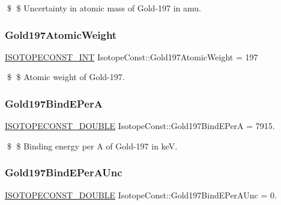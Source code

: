 \$ \$ Uncertainty in atomic mass of Gold-\/197 in amu. \mbox{\label{group___isotope_const-_gold-_au197_gad5a8898e7bb7d4cd224bde8a453be610}} 
\subsubsection{\texorpdfstring{Gold197\+Atomic\+Weight}{Gold197AtomicWeight}}
{\footnotesize\ttfamily \mbox{\hyperlink{group___isotope_const-_macros_ga5f18360b3e99483a35c32d789e62621c}{I\+S\+O\+T\+O\+P\+E\+C\+O\+N\+S\+T\+\_\+\+I\+NT}} Isotope\+Const\+::\+Gold197\+Atomic\+Weight = 197}

\$ \$ Atomic weight of Gold-\/197. \mbox{\label{group___isotope_const-_gold-_au197_ga88d86371a400ebcee68e4640bfe9cdb9}} 
\subsubsection{\texorpdfstring{Gold197\+Bind\+E\+PerA}{Gold197BindEPerA}}
{\footnotesize\ttfamily \mbox{\hyperlink{group___isotope_const-_macros_ga8f45a7272ce02c0b4c65c44636ed719a}{I\+S\+O\+T\+O\+P\+E\+C\+O\+N\+S\+T\+\_\+\+D\+O\+U\+B\+LE}} Isotope\+Const\+::\+Gold197\+Bind\+E\+PerA = 7915.}

\$ \$ Binding energy per A of Gold-\/197 in keV. \mbox{\label{group___isotope_const-_gold-_au197_ga564bc07c8f13de191f16fac0323c77a2}} 
\subsubsection{\texorpdfstring{Gold197\+Bind\+E\+Per\+A\+Unc}{Gold197BindEPerAUnc}}
{\footnotesize\ttfamily \mbox{\hyperlink{group___isotope_const-_macros_ga8f45a7272ce02c0b4c65c44636ed719a}{I\+S\+O\+T\+O\+P\+E\+C\+O\+N\+S\+T\+\_\+\+D\+O\+U\+B\+LE}} Isotope\+Const\+::\+Gold197\+Bind\+E\+Per\+A\+Unc = 0.}

